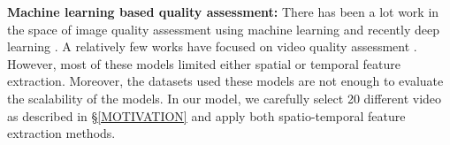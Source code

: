 \noindent \textbf{Machine learning based quality assessment:} There has been a lot work in the space of image quality assessment using machine learning \cite{hou2015blind}\cite{ye2012unsupervised} and recently deep learning \cite{mocanu2014deep}\cite{xue2013learning}\cite{narwaria2010objective}. A relatively few works have focused on video quality assessment \cite{le2006convolutional}\cite{narwaria2012low}. However, most of these models limited either spatial or temporal feature extraction. Moreover, the datasets used these models are not enough to evaluate the scalability of the models. In our model, we carefully select 20 different video as described in \S \ref{MOTIVATION} and apply both spatio-temporal feature extraction methods.

